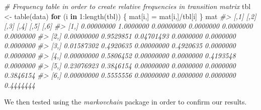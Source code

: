 \documentclass[
]{article}
\newenvironment{Shaded}{\begin{snugshade}}{\end{snugshade}}
\newcommand{\CommentTok}[1]{\textcolor[rgb]{0.56,0.35,0.01}{\textit{#1}}}
\newcommand{\ControlFlowTok}[1]{\textcolor[rgb]{0.13,0.29,0.53}{\textbf{#1}}}
\newcommand{\DecValTok}[1]{\textcolor[rgb]{0.00,0.00,0.81}{#1}}
\newcommand{\FunctionTok}[1]{\textcolor[rgb]{0.00,0.00,0.00}{#1}}
\newcommand{\NormalTok}[1]{#1}
\newcommand{\OtherTok}[1]{\textcolor[rgb]{0.56,0.35,0.01}{#1}}
\newcommand{\SpecialCharTok}[1]{\textcolor[rgb]{0.00,0.00,0.00}{#1}}
\begin{document}
\begin{Shaded}
\begin{Highlighting}[]
\CommentTok{\# Frequency table in order to create relative frequencies in transition matrix}
\NormalTok{tbl }\OtherTok{\textless{}{-}} \FunctionTok{table}\NormalTok{(data)}
\ControlFlowTok{for}\NormalTok{ (i }\ControlFlowTok{in} \DecValTok{1}\SpecialCharTok{:}\FunctionTok{length}\NormalTok{(tbl)) \{}
\NormalTok{  mat[i,] }\OtherTok{=}\NormalTok{ mat[i,]}\SpecialCharTok{/}\NormalTok{tbl[i]}
\NormalTok{\}}
\NormalTok{mat}
\CommentTok{\#\textgreater{}            [,1]      [,2]       [,3]      [,4]      [,5]      [,6]}
\CommentTok{\#\textgreater{} [1,] 0.00000000 1.0000000 0.00000000 0.0000000 0.0000000 0.0000000}
\CommentTok{\#\textgreater{} [2,] 0.00000000 0.9529851 0.04701493 0.0000000 0.0000000 0.0000000}
\CommentTok{\#\textgreater{} [3,] 0.01587302 0.4920635 0.00000000 0.4920635 0.0000000 0.0000000}
\CommentTok{\#\textgreater{} [4,] 0.00000000 0.5806452 0.00000000 0.0000000 0.4193548 0.0000000}
\CommentTok{\#\textgreater{} [5,] 0.23076923 0.3846154 0.00000000 0.0000000 0.0000000 0.3846154}
\CommentTok{\#\textgreater{} [6,] 0.00000000 0.5555556 0.00000000 0.0000000 0.0000000 0.4444444}
\end{Highlighting}
\end{Shaded}

\newpage

We then tested using the \emph{markovchain} package in order to confirm
our results.

\begin{Shaded}
\end{Shaded}
\end{document}
